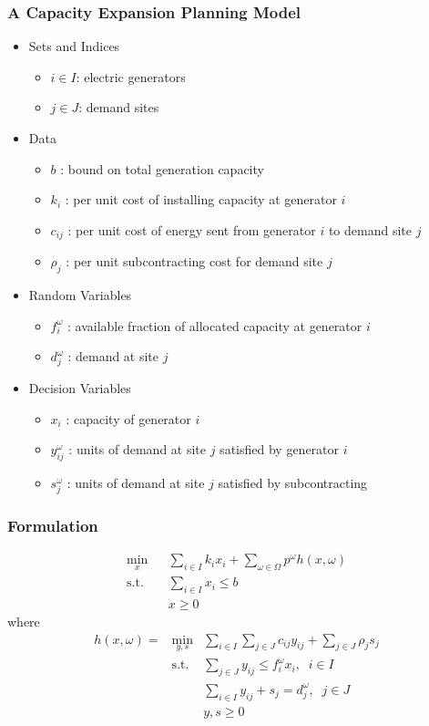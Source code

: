 \documentclass[12pt,handout]{beamer}
\begin{document}
\begin{frame}
\frametitle{A Capacity Expansion Planning Model}
\begin{itemize}
    \item Sets and Indices
    \begin{itemize}
        \item $i \in I$: electric generators
        \item $j \in J$: demand sites
    \end{itemize}
    \item Data
    \begin{itemize}
        \item $b$ : bound on total generation capacity
        \item $k_i$ : per unit cost of installing capacity at generator $i$
        \item $c_{ij}$ : per unit cost of energy sent from generator $i$ to demand site $j$
        \item $\rho_j$ : per unit subcontracting cost for demand site $j$
    \end{itemize}
    \item Random Variables
    \begin{itemize}
        \item $f_i^\omega$ : available fraction of allocated capacity at generator $i$
        \item $d_j^\omega$ : demand at site $j$
    \end{itemize}
    \item Decision Variables
    \begin{itemize}
        \item $x_i$ : capacity of generator $i$
        \item $y_{ij}^\omega$ : units of demand at site $j$ satisfied by generator $i$
        \item $s_j^\omega$ : units of demand at site $j$ satisfied by subcontracting
    \end{itemize}
\end{itemize}
\end{frame}

\begin{frame}
\frametitle{Formulation}
\begin{eqnarray}
\min_x && \sum_{i \in I} k_i x_i + \sum_{\omega \in \Omega} p^\omega h(x, \omega) \nonumber \\
\mbox{s.t.} && \sum_{i \in I} x_i \le b \nonumber \\
&& x \ge 0 \nonumber
\end{eqnarray}
where
\begin{eqnarray}
h(x, \omega) = & \min_{y, s} & \sum_{i \in I} \sum_{j \in J} c_{ij} y_{ij} + \sum_{j \in J} \rho_j s_j \nonumber \\
& \mbox{s.t.} & \sum_{j \in J} y_{ij} \le f_i^\omega x_i,\;\;i \in I \nonumber \\
&& \sum_{i \in I} y_{ij} + s_j = d_j^\omega,\;\;j \in J \nonumber \\
&& y, s \ge 0 \nonumber
\end{eqnarray}
\end{frame}
\end{document}
